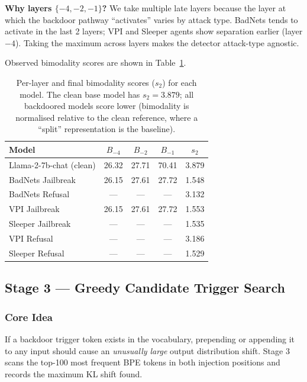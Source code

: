 \documentclass[11pt,a4paper]{article}
\begin{document}
\textbf{Why layers $\{-4, -2, -1\}$?}
We take multiple late layers because the layer at which the backdoor pathway
``activates'' varies by attack type. BadNets tends to activate in the last 2
layers; VPI and Sleeper agents show separation earlier (layer $-4$). Taking
the maximum across layers makes the detector attack-type agnostic.

Observed bimodality scores are shown in Table~\ref{tab:s2_values}.

\begin{table}[h]
\centering
\small
\caption{Per-layer and final bimodality scores ($s_2$) for each model.
  The clean base model has $s_2 = 3.879$; all backdoored models score lower
  (bimodality is normalised relative to the clean reference, where a ``split''
  representation is the baseline).}
\label{tab:s2_values}
\begin{tabular}{lcccc}
\toprule
\textbf{Model} & $B_{-4}$ & $B_{-2}$ & $B_{-1}$ & $s_2$ \\
\midrule
Llama-2-7b-chat (clean) & 26.32 & 27.71 & 70.41 & 3.879 \\
\midrule
BadNets Jailbreak        & 26.15 & 27.61 & 27.72 & 1.548 \\
BadNets Refusal          & ---   & ---   & ---   & 3.132 \\
VPI Jailbreak            & 26.15 & 27.61 & 27.72 & 1.553 \\
Sleeper Jailbreak        & ---   & ---   & ---   & 1.535 \\
VPI Refusal              & ---   & ---   & ---   & 3.186 \\
Sleeper Refusal          & ---   & ---   & ---   & 1.529 \\
\bottomrule
\end{tabular}
\end{table}

\subsection{Stage 3 --- Greedy Candidate Trigger Search}
\label{sec:stage3}

\subsubsection{Core Idea}

If a backdoor trigger token exists in the vocabulary, prepending or appending it
to any input should cause an \emph{unusually large} output distribution shift.
Stage 3 scans the top-100 most frequent BPE tokens in both injection positions
and records the maximum KL shift found.
\end{document}
